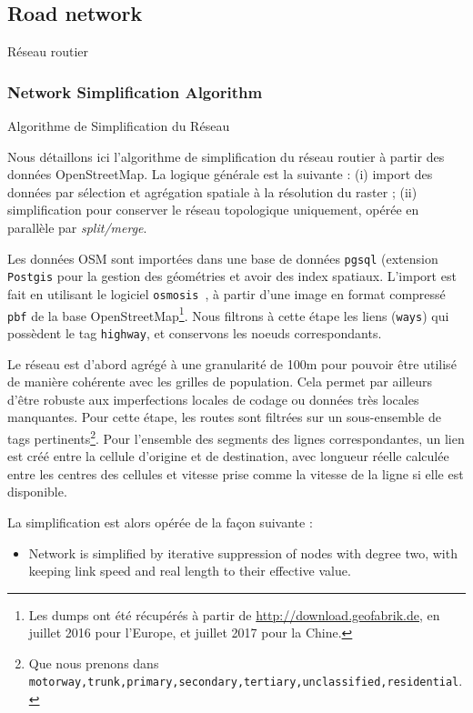 \subsection{Road network}{Réseau routier}




\subsubsection{Network Simplification Algorithm}{Algorithme de Simplification du Réseau}


Nous détaillons ici l'algorithme de simplification du réseau routier à partir des données OpenStreetMap. La logique générale est la suivante : (i) import des données par sélection et agrégation spatiale à la résolution du raster ; (ii) simplification pour conserver le réseau topologique uniquement, opérée en parallèle par \emph{split/merge}.


Les données OSM sont importées dans une base de données \texttt{pgsql} (extension \texttt{Postgis} pour la gestion des géométries et avoir des index spatiaux. L'import est fait en utilisant le logiciel \texttt{osmosis}~\cite{osmosis}, à partir d'une image en format compressé \texttt{pbf} de la base OpenStreetMap\footnote{Les dumps ont été récupérés à partir de \url{http://download.geofabrik.de}, en juillet 2016 pour l'Europe, et juillet 2017 pour la Chine.}. Nous filtrons à cette étape les liens (\texttt{ways}) qui possèdent le tag \texttt{highway}, et conservons les noeuds correspondants.


Le réseau est d'abord agrégé à une granularité de 100m pour pouvoir être utilisé de manière cohérente avec les grilles de population. Cela permet par ailleurs d'être robuste aux imperfections locales de codage ou données très locales manquantes. Pour cette étape, les routes sont filtrées sur un sous-ensemble de tags pertinents\footnote{Que nous prenons dans \texttt{motorway,trunk,primary,secondary,tertiary,unclassified,residential}.}. Pour l'ensemble des segments des lignes correspondantes, un lien est créé entre la cellule d'origine et de destination, avec longueur réelle calculée entre les centres des cellules et vitesse prise comme la vitesse de la ligne si elle est disponible.
  
La simplification est alors opérée de la façon suivante :
\begin{itemize}
\item Network is simplified by iterative suppression of nodes with degree two, with keeping link speed and real length to their effective value.
\end{itemize}

